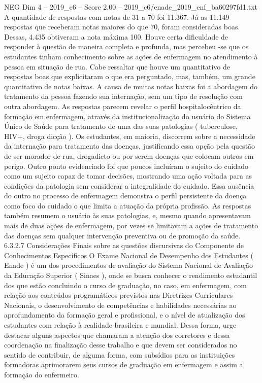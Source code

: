\begin{textsample}{NEG Dim 4 – 2019\_c6 – Score 2.00 – 2019\_c6/enade\_2019\_enf\_ba60297fd1.txt}
A quantidade de respostas com notas de 31 a 70 foi 11.367.
Já as 11.149 respostas que receberam notas maiores do que 70, foram consideradas boas.
Dessas, 4.435 obtiveram a nota máxima 100.
Houve certa dificuldade de responder à questão de maneira completa e profunda, mas percebeu -se que os estudantes tinham conhecimento sobre as ações de enfermagem no atendimento à pessoa em situação de rua.
Cabe ressaltar que houve um quantitativo de respostas boas que explicitaram o que era perguntado, mas, também, um grande quantitativo de notas baixas.
A causa de muitas notas baixas foi a abordagem do tratamento da pessoa fazendo sua internação, sem um tipo de resolução com outra abordagem.
As respostas parecem revelar o perfil hospitalocêntrico da formação em enfermagem, através da institucionalização do usuário do Sistema Único de Saúde para tratamento de uma das suas patologias ( tuberculose, HIV+, droga dicção ).
Os estudantes, em maioria, discorrem sobre a necessidade da internação para tratamento das doenças, justificando essa opção pela questão de ser morador de rua, drogadicto ou por serem doenças que colocam outros em perigo.
Outro ponto evidenciado foi que poucos incluíram o sujeito do cuidado como um sujeito capaz de tomar decisões, mostrando uma ação voltada para as condições da patologia sem considerar a integralidade do cuidado.
Essa ausência do outro no processo de enfermagem demonstra o perfil persistente da doença como foco do cuidado o que limita a atuação da própria profissão.
As respostas também resumem o usuário às suas patologias, e, mesmo quando apresentavam mais de duas ações de enfermagem, por vezes se limitavam a ações de tratamento das doenças sem qualquer intervenção preventiva ou de promoção da saúde. 6.3.2.7 Considerações Finais sobre as questões discursivas do Componente de Conhecimentos Específicos O Exame Nacional de Desempenho dos Estudantes ( Enade ) é um dos procedimentos de avaliação do Sistema Nacional de Avaliação da Educação Superior ( Sinaes ), onde se busca conhecer o rendimento estudantil dos que estão concluindo o curso de graduação, no caso, em enfermagem, com relação aos conteúdos programáticos previstos nas Diretrizes Curriculares Nacionais, o desenvolvimento de competências e habilidades necessárias ao aprofundamento da formação geral e profissional, e o nível de atualização dos estudantes com relação à realidade brasileira e mundial.
Dessa forma, urge destacar alguns aspectos que chamaram a atenção dos corretores e dessa coordenação na finalização desse trabalho e que devem ser considerados no sentido de contribuir, de alguma forma, com subsídios para as instituições formadoras aprimorarem seus cursos de graduação em enfermagem e assim a formação do enfermeiro.

\end{textsample}
